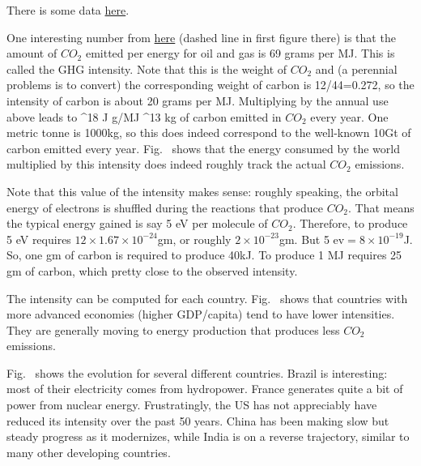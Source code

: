\documentclass[11pt]{book}
\begin{document}
There is some data \href{https://github.com/owid/co2-data}{here}.

One interesting number from \href{https://www.science.org/doi/10.1126/science.abh0687}{here} (dashed line in first figure there) is that the amount of $CO_2$ emitted per energy for oil and gas is 69 grams per MJ. This is called the GHG intensity. Note that this is the weight of $CO_2$ and (a perennial problems is to convert) the corresponding weight of carbon is 12/44=0.272, so the intensity of carbon is about 20 grams per MJ. Multiplying by the annual use above leads to 
^{18} J  g/MJ ^{13} kg
\ee
of carbon emitted in $CO_2$ every year. One metric tonne is 1000kg, so this does indeed correspond to the well-known 10Gt of carbon emitted every year.
Fig.~ shows that the energy consumed by the world multiplied by this intensity does indeed roughly track the actual $CO_2$ emissions.

Note that this value of the intensity makes sense: roughly speaking, the orbital energy of electrons is shuffled during the reactions that produce $CO_2$. That means the typical energy gained is say 5 eV per molecule of $CO_2$. Therefore, to produce 5 eV requires $12\times 1.67\times 10^{-24}$gm, or roughly $2\times10^{-23}$gm. But 5 ev$=8\times 10^{-19}$J. So, one gm of carbon is required to produce 40kJ. To produce 1 MJ requires 25 gm of carbon, which pretty close to the observed intensity.

The intensity can be computed for each country. Fig.~ shows that countries with more advanced economies (higher GDP/capita) tend to have lower intensities. They are generally moving to energy production that produces less $CO_2$ emissions. 

Fig.~ shows the evolution for several different countries. Brazil is interesting: most of their electricity comes from hydropower. France generates quite a bit of power from nuclear energy. Frustratingly, the US has not appreciably have reduced its intensity over the past 50 years. China has been making slow but steady progress as it modernizes, while India is on a reverse trajectory, similar to many other developing countries.
\end{document}
